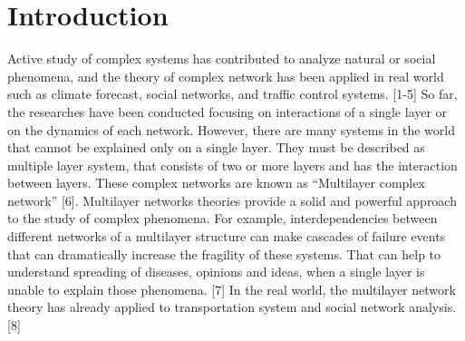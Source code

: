 \documentclass[english]{cccconf}
\begin{document}


\section{Introduction}

 Active study of complex systems has contributed to analyze natural or social phenomena, and the theory of complex network has been applied in real world such as climate forecast, social networks, and traffic control systems. [1-5]
So far, the researches have been conducted focusing on interactions of a single layer or on the dynamics of each network. However, there are many systems in the world that cannot be explained only on a single layer. They must be described as multiple layer system, that consists of two or more layers and has the interaction between layers. These complex networks are known  as ``Multilayer complex network'' [6].
Multilayer networks theories provide a solid and powerful approach to the study of complex phenomena. For example, interdependencies between different networks of a multilayer structure can make cascades of failure events that can dramatically increase the fragility of these systems. That can help to understand spreading of diseases, opinions and ideas, when a single layer is unable to explain those phenomena. [7] In the real world, the multilayer network theory has already applied to transportation system and social network analysis. [8] 
\end{document}
